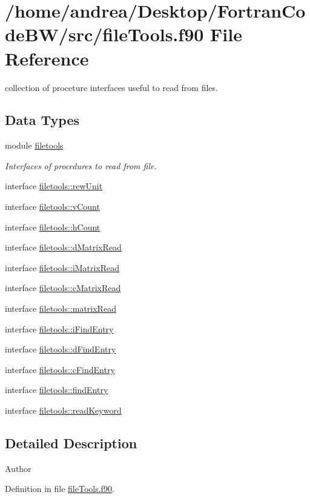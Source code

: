 \hypertarget{file_tools_8f90}{\section{/home/andrea/\-Desktop/\-Fortran\-Code\-B\-W/src/file\-Tools.f90 File Reference}
\label{file_tools_8f90}
}


collection of proceture interfaces useful to read from files.  


\subsection*{Data Types}
\begin{DoxyCompactItemize}
\item 
module \hyperlink{classfiletools}{filetools}
\begin{DoxyCompactList}\small\item\em Interfaces of procedures to read from file. \end{DoxyCompactList}\item 
interface \hyperlink{interfacefiletools_1_1rew_unit}{filetools\-::rew\-Unit}
\item 
interface \hyperlink{interfacefiletools_1_1v_count}{filetools\-::v\-Count}
\item 
interface \hyperlink{interfacefiletools_1_1h_count}{filetools\-::h\-Count}
\item 
interface \hyperlink{interfacefiletools_1_1d_matrix_read}{filetools\-::d\-Matrix\-Read}
\item 
interface \hyperlink{interfacefiletools_1_1i_matrix_read}{filetools\-::i\-Matrix\-Read}
\item 
interface \hyperlink{interfacefiletools_1_1c_matrix_read}{filetools\-::c\-Matrix\-Read}
\item 
interface \hyperlink{interfacefiletools_1_1matrix_read}{filetools\-::matrix\-Read}
\item 
interface \hyperlink{interfacefiletools_1_1i_find_entry}{filetools\-::i\-Find\-Entry}
\item 
interface \hyperlink{interfacefiletools_1_1d_find_entry}{filetools\-::d\-Find\-Entry}
\item 
interface \hyperlink{interfacefiletools_1_1c_find_entry}{filetools\-::c\-Find\-Entry}
\item 
interface \hyperlink{interfacefiletools_1_1find_entry}{filetools\-::find\-Entry}
\item 
interface \hyperlink{interfacefiletools_1_1read_keyword}{filetools\-::read\-Keyword}
\end{DoxyCompactItemize}


\subsection{Detailed Description}
\begin{DoxyAuthor}{Author}

\end{DoxyAuthor}


Definition in file \hyperlink{file_tools_8f90_source}{file\-Tools.\-f90}.


